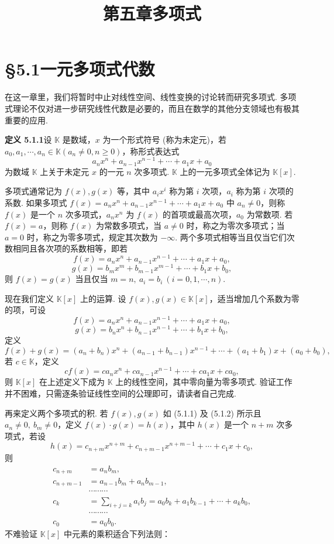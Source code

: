 \documentclass[UTF8,12pt,a4paper,fontset=fandol]{ctexart}
\title{第五章\quad 多项式}
\author{}
\date{}
\begin{document}
\maketitle

\section*{§5.1\quad 一元多项式代数}

在这一章里，我们将暂时中止对线性空间、线性变换的讨论转而研究多项式. 多项式理论不仅对进一步研究线性代数是必要的，而且在数学的其他分支领域也有极其重要的应用.

\noindent\textbf{定义 5.1.1}\quad 设 $\mathbb{K}$ 是数域，$x$ 为一个形式符号 (称为未定元)，若 $a_0,a_1,\cdots,a_n\in\mathbb{K}(a_n\neq 0,n\geq 0)$，称形式表达式
\[
a_nx^n+a_{n-1}x^{n-1}+\cdots+a_1x+a_0
\]
为数域 $\mathbb{K}$ 上关于未定元 $x$ 的一元 $n$ 次多项式. $\mathbb{K}$ 上的一元多项式全体记为 $\mathbb{K}[x]$.

多项式通常记为 $f(x),g(x)$ 等，其中 $a_ix^i$ 称为第 $i$ 次项，$a_i$ 称为第 $i$ 次项的系数. 如果多项式 $f(x)=a_nx^n+a_{n-1}x^{n-1}+\cdots+a_1x+a_0$ 中 $a_n\neq 0$，则称 $f(x)$ 是一个 $n$ 次多项式，$a_nx^n$ 为 $f(x)$ 的首项或最高次项，$a_0$ 为常数项. 若 $f(x)=a$，则称 $f(x)$ 为常数多项式，当 $a\neq 0$ 时，称之为零次多项式；当 $a=0$ 时，称之为零多项式，规定其次数为 $-\infty$. 两个多项式相等当且仅当它们次数相同且各次项的系数相等，即若
\begin{equation}
f(x)=a_nx^n+a_{n-1}x^{n-1}+\cdots+a_1x+a_0,
\tag{5.1.1}
\end{equation}
\begin{equation}
g(x)=b_mx^m+b_{m-1}x^{m-1}+\cdots+b_1x+b_0,
\tag{5.1.2}
\end{equation}
则 $f(x)=g(x)$ 当且仅当 $m=n,\ a_i=b_i\ (i=0,1,\cdots,n)$.

现在我们定义 $\mathbb{K}[x]$ 上的运算. 设 $f(x),g(x)\in\mathbb{K}[x]$，适当增加几个系数为零的项，可设
\[
f(x)=a_nx^n+a_{n-1}x^{n-1}+\cdots+a_1x+a_0,
\]
\[
g(x)=b_nx^n+b_{n-1}x^{n-1}+\cdots+b_1x+b_0,
\]
定义
\[
f(x)+g(x)=(a_n+b_n)x^n+(a_{n-1}+b_{n-1})x^{n-1}+\cdots+(a_1+b_1)x+(a_0+b_0),
\]
若 $c\in\mathbb{K}$，定义
\[
cf(x)=ca_nx^n+ca_{n-1}x^{n-1}+\cdots+ca_1x+ca_0,
\]
则 $\mathbb{K}[x]$ 在上述定义下成为 $\mathbb{K}$ 上的线性空间，其中零向量为零多项式. 验证工作并不困难，只需逐条验证线性空间的公理即可，请读者自己完成.

再来定义两个多项式的积. 若 $f(x),g(x)$ 如 (5.1.1) 及 (5.1.2) 所示且 $a_n\neq 0,\ b_m\neq 0$，定义 $f(x)\cdot g(x)=h(x)$，其中 $h(x)$ 是一个 $n+m$ 次多项式，若设
\[
h(x)=c_{n+m}x^{n+m}+c_{n+m-1}x^{n+m-1}+\cdots+c_1x+c_0,
\]
则
\[
\begin{aligned}
c_{n+m}&=a_nb_m,\\
c_{n+m-1}&=a_{n-1}b_m+a_nb_{m-1},\\
&\cdots\cdots\cdots\\
c_k&=\sum_{i+j=k}a_ib_j=a_0b_k+a_1b_{k-1}+\cdots+a_kb_0,\\
&\cdots\cdots\cdots\\
c_0&=a_0b_0.
\end{aligned}
\]
不难验证 $\mathbb{K}[x]$ 中元素的乘积适合下列法则：
\end{document}
